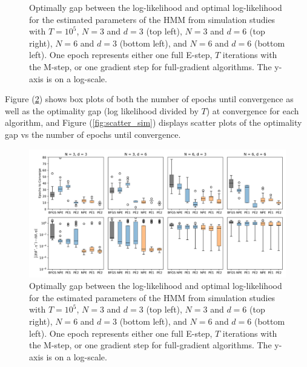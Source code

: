 \begin{figure}
    \caption{Optimally gap between the log-likelihood and optimal log-likelihood for the estimated parameters of the HMM from simulation studies with $T=10^{5}$, $N=3$ and $d=3$ (top left), $N=3$ and $d=6$ (top right), $N=6$ and $d=3$ (bottom left), and $N=6$ and $d=6$ (bottom left). One epoch represents either one full E-step, $T$ iterations with the M-step, or one gradient step for full-gradient algorithms. The y-axis is on a log-scale.}
    \label{fig:ll_trace_sim}
\end{figure}

Figure (\ref{fig:boxplots_sim}) shows box plots of both the number of epochs until convergence as well as the optimality gap (log likelihood divided by $T$) at convergence for each algorithm, and Figure (\ref{fig:scatter_sim}) displays scatter plots of the optimality gap vs the number of epochs until convergence.
%
\begin{figure}
    \centering
    \includegraphics[width=6.5in]{../plt/boxplots_sim.png}
    \caption{Optimally gap between the log-likelihood and optimal log-likelihood for the estimated parameters of the HMM from simulation studies with $T=10^{5}$, $N=3$ and $d=3$ (top left), $N=3$ and $d=6$ (top right), $N=6$ and $d=3$ (bottom left), and $N=6$ and $d=6$ (bottom left). One epoch represents either one full E-step, $T$ iterations with the M-step, or one gradient step for full-gradient algorithms. The y-axis is on a log-scale.}
    \label{fig:boxplots_sim}
\end{figure}
%
